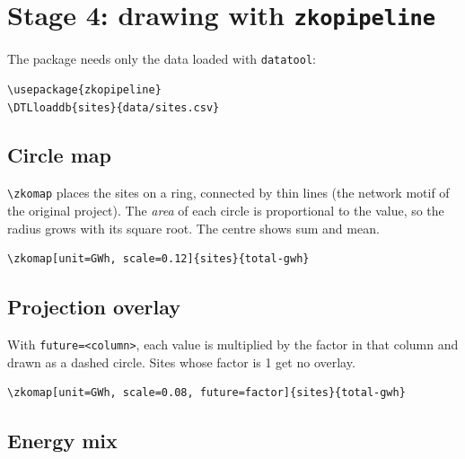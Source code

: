 \documentclass[11pt,a4paper]{article}
\begin{document}
\section{Stage 4: drawing with \texttt{zkopipeline}}\label{sec:draw}

The package needs only the data loaded with \texttt{datatool}:
\begin{Verbatim}
\usepackage{zkopipeline}
\DTLloaddb{sites}{data/sites.csv}
\end{Verbatim}

\subsection{Circle map}

\verb|\zkomap| places the sites on a ring, connected by thin lines (the
network motif of the original project). The \emph{area} of each circle is
proportional to the value, so the radius grows with its square root. The
centre shows sum and mean.

\begin{Verbatim}
\zkomap[unit=GWh, scale=0.12]{sites}{total-gwh}
\end{Verbatim}

\begin{center}
\end{center}

\subsection{Projection overlay}

With \texttt{future=<column>}, each value is multiplied by the factor in that
column and drawn as a dashed circle. Sites whose factor is 1 get no overlay.

\begin{Verbatim}
\zkomap[unit=GWh, scale=0.08, future=factor]{sites}{total-gwh}
\end{Verbatim}

\begin{center}
\end{center}
\let\sitesnow\zkoresult \let\sitesfuture\zkofutureresult

\subsection{Energy mix}
\end{document}
